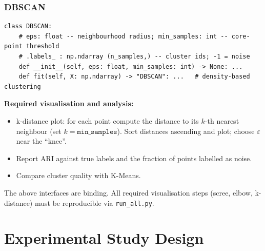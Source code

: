 \documentclass[11pt,a4paper]{article}
\begin{document}
\subsubsection{DBSCAN}
\begin{lstlisting}[style=python, label=lst:dbscan]
class DBSCAN:
    # eps: float -- neighbourhood radius; min_samples: int -- core-point threshold
    # .labels_ : np.ndarray (n_samples,) -- cluster ids; -1 = noise
    def __init__(self, eps: float, min_samples: int) -> None: ...
    def fit(self, X: np.ndarray) -> "DBSCAN": ...   # density-based clustering
\end{lstlisting}
\vspace{0.4em}
\textbf{Required visualisation and analysis:}
\begin{itemize}
  \item k-distance plot: for each point compute the distance to its $k$-th nearest neighbour (set $k = \texttt{min\_samples}$). Sort distances ascending and plot; choose $\varepsilon$ near the ``knee''.
  \item Report ARI against true labels and the fraction of points labelled as noise.
  \item Compare cluster quality with K-Means.
\end{itemize}

\medskip
\noindent The above interfaces are binding. All required visualisation steps (scree, elbow, k-distance) must be reproducible via \texttt{run\_all.py}.
\section{Experimental Study Design}\label{sec:experiments}
\end{document}
